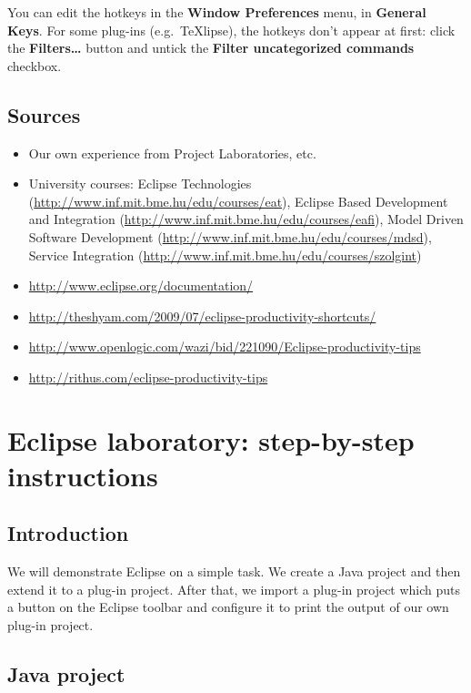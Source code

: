 \documentclass[]{report}
\begin{document}
You can edit the hotkeys in the \textbf{Window \textbar{} Preferences}
menu, in \textbf{General \textbar{} Keys}. For some plug-ins
(e.g.~TeXlipse), the hotkeys don't appear at first: click the
\textbf{Filters\ldots{}} button and untick the \textbf{Filter
uncategorized commands} checkbox.

\section{Sources}

\begin{itemize}
\itemsep1pt\parskip0pt
\item
  Our own experience from Project Laboratories, etc.
\item
  University courses: Eclipse Technologies
  (\url{http://www.inf.mit.bme.hu/edu/courses/eat}), Eclipse Based
  Development and Integration
  (\url{http://www.inf.mit.bme.hu/edu/courses/eafi}), Model Driven
  Software Development
  (\url{http://www.inf.mit.bme.hu/edu/courses/mdsd}), Service
  Integration (\url{http://www.inf.mit.bme.hu/edu/courses/szolgint})
\item
  \url{http://www.eclipse.org/documentation/}
\item
  \url{http://theshyam.com/2009/07/eclipse-productivity-shortcuts/}
\item
  \url{http://www.openlogic.com/wazi/bid/221090/Eclipse-productivity-tips}
\item
  \url{http://rithus.com/eclipse-productivity-tips}
\end{itemize}

\chapter{Eclipse laboratory: step-by-step instructions}

\section{Introduction}

We will demonstrate Eclipse on a simple task. We create a Java project
and then extend it to a plug-in project. After that, we import a plug-in
project which puts a button on the Eclipse toolbar and configure it to
print the output of our own plug-in project.

\section{Java project}
\end{document}
